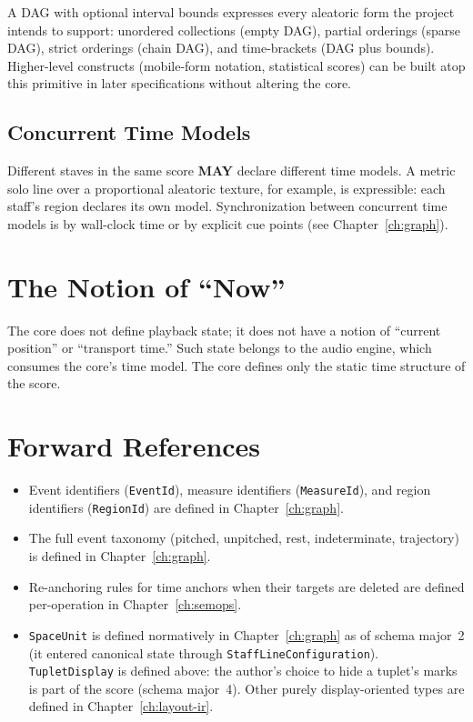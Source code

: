 \documentclass[11pt,letterpaper]{report}
\newcommand{\MAY}{\textbf{MAY}}
\begin{document}
\begin{rationale}
  A DAG with optional interval bounds expresses every aleatoric form
  the project intends to support: unordered collections (empty DAG),
  partial orderings (sparse DAG), strict orderings (chain DAG), and
  time-brackets (DAG plus bounds). Higher-level constructs
  (mobile-form notation, statistical scores) can be built atop this
  primitive in later specifications without altering the core.
\end{rationale}

\subsection{Concurrent Time Models}

Different staves in the same score \MAY{} declare different time
models. A metric solo line over a proportional aleatoric texture, for
example, is expressible: each staff's region declares its own model.
Synchronization between concurrent time models is by wall-clock time
or by explicit cue points (see Chapter~\ref{ch:graph}).

\section{The Notion of ``Now''}
\label{sec:time:now}

The core does not define playback state; it does not have a notion of
``current position'' or ``transport time.'' Such state belongs to the
audio engine, which consumes the core's time model. The core defines
only the static time structure of the score.

\section{Forward References}

\begin{itemize}
  \item Event identifiers (\texttt{EventId}), measure identifiers
    (\texttt{MeasureId}), and region identifiers (\texttt{RegionId})
    are defined in Chapter~\ref{ch:graph}.
  \item The full event taxonomy (pitched, unpitched, rest, indeterminate,
    trajectory) is defined in Chapter~\ref{ch:graph}.
  \item Re-anchoring rules for time anchors when their targets are
    deleted are defined per-operation in Chapter~\ref{ch:semops}.
  \item \texttt{SpaceUnit} is defined normatively in
    Chapter~\ref{ch:graph} as of schema major~2 (it entered canonical
    state through \texttt{StaffLineConfiguration}).
    \texttt{TupletDisplay} is defined above: the author's choice to hide
    a tuplet's marks is part of the score (schema major~4). Other purely
    display-oriented types are defined in Chapter~\ref{ch:layout-ir}.
\end{itemize}
\end{document}
